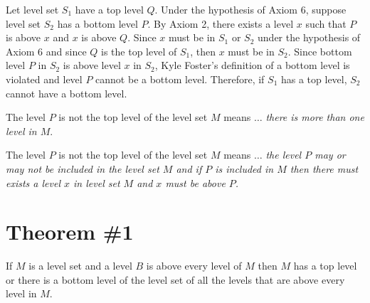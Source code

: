 \problem
\solutionAlt
Let level set $S_1$ have a top level $Q$. Under the hypothesis of Axiom 6, suppose level set $S_2$ has a bottom level $P$. By Axiom 2, there exists a level $x$ such that $P$ is above $x$ and $x$ is above $Q$. Since $x$ must be in $S_1$ or $S_2$ under the hypothesis of Axiom 6 and since $Q$ is the top level of $S_1$, then $x$ must be in $S_2$. Since bottom level $P$ in $S_2$ is above level $x$ in $S_2$, Kyle Foster's definition of a bottom level is violated and level $P$ cannot be a bottom level. Therefore, if $S_1$ has a top level, $S_2$ cannot have a bottom level.


\problem
The level $P$ is not the top level of the level set $M$ means $\dots$ \textit{there is more than one level in $M$}.

The level $P$ is not the top level of the level set $M$ means $\dots$ \textit{the level $P$ may or may not be included in the level set $M$ and if $P$ is included in $M$ then there must exists a level $x$ in level set $M$ and $x$ must be above $P$.}


\section*{Theorem \#1}
\begin{theorem}
    If $M$ is a level set and a level $B$ is above every level of $M$ then $M$ has a top level or there is a bottom level of the level set of all the levels that are above every level in $M$.
\end{theorem}

